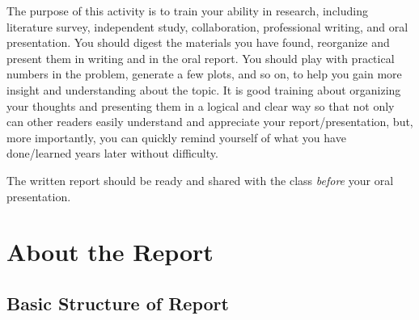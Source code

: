 \documentclass[aps,prd,preprint,floats,epsf,superscriptaddress,nofootinbib]{revtex4}
\begin{document}
The purpose of this activity is to train your ability in research, including literature survey, independent study, collaboration, professional writing, and oral presentation.  You should digest the materials you have found, reorganize and present them in writing and in the oral report.  You should play with practical numbers in the problem, generate a few plots, and so on, to help you gain more insight and understanding about the topic.  It is good training about organizing your thoughts and presenting them in a logical and clear way so that not only can other readers easily understand and appreciate your report/presentation, but, more importantly, you can quickly remind yourself of what you have done/learned years later without difficulty.


The written report should be ready and shared with the class {\it before} your oral presentation.


\section{About the Report}
\label{sec:About the Report}



\subsection{Basic Structure of Report}
\label{sec:Basic Structure of Report}
\end{document}
